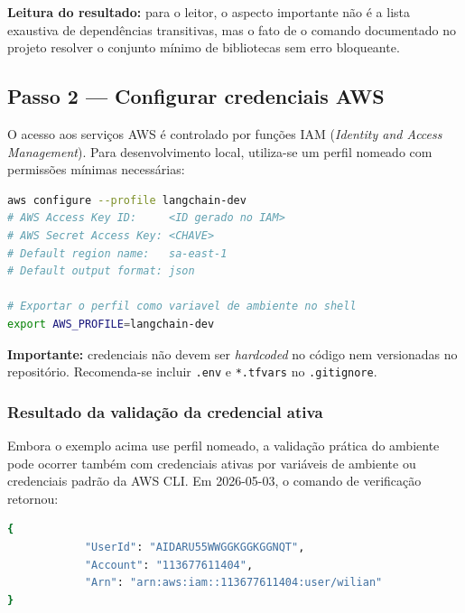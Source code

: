 \noindent\textbf{Leitura do resultado:} para o leitor, o aspecto
importante n\~ao \'e a lista exaustiva de depend\^encias transitivas, mas
o fato de o comando documentado no projeto resolver o conjunto m\'inimo
de bibliotecas sem erro bloqueante.

\subsection{Passo 2 --- Configurar credenciais AWS}

O acesso aos servi\c{c}os AWS \'e controlado por fun\c{c}\~oes IAM
(\textit{Identity and Access Management}). Para desenvolvimento local,
utiliza-se um perfil nomeado com permiss\~oes m\'inimas necess\'arias:

\begin{lstlisting}[language=bash,
  caption={Configura\c{c}\~ao do perfil AWS para desenvolvimento.},
  label={lst:aws_profile}]
aws configure --profile langchain-dev
# AWS Access Key ID:     <ID gerado no IAM>
# AWS Secret Access Key: <CHAVE>
# Default region name:   sa-east-1
# Default output format: json

# Exportar o perfil como variavel de ambiente no shell
export AWS_PROFILE=langchain-dev
\end{lstlisting}

\noindent\textbf{Importante:} credenciais n\~ao devem ser
\textit{hardcoded} no c\'odigo nem versionadas no reposit\'orio.
Recomenda-se incluir \texttt{.env} e \texttt{*.tfvars} no
\texttt{.gitignore}.

\subsubsection*{Resultado da valida\c{c}\~ao da credencial ativa}

Embora o exemplo acima use perfil nomeado, a valida\c{c}\~ao pr\'atica do
ambiente pode ocorrer tamb\'em com credenciais ativas por vari\'aveis de
ambiente ou credenciais padr\~ao da AWS CLI. Em 2026-05-03, o comando
de verifica\c{c}\~ao retornou:

\begin{lstlisting}[language=bash,
      caption={Identidade AWS observada no ambiente de desenvolvimento.},
      label={lst:cap2_aws_identity}]
{
            "UserId": "AIDARU55WWGGKGGKGGNQT",
            "Account": "113677611404",
            "Arn": "arn:aws:iam::113677611404:user/wilian"
}
\end{lstlisting}

